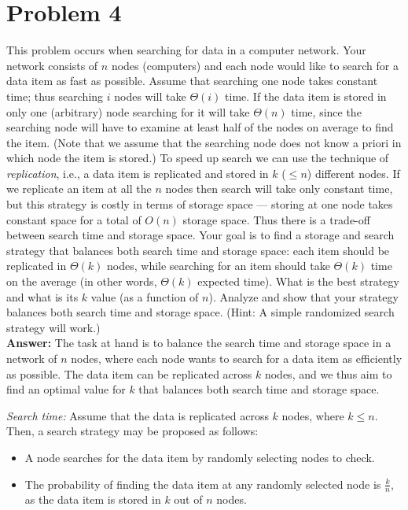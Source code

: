 \documentclass[11pt]{article}
\begin{document}
\section*{Problem 4}

This problem occurs  when searching
for data in a computer network. Your  network consists of $n$
nodes (computers) and each node would like to search for a data
item as fast as possible. Assume that searching one node takes
constant time; thus searching $i$ nodes will take $\Theta(i)$
time. If the data item is stored in only one (arbitrary) node
searching for it will take $\Theta(n)$
 time, since the searching node will have to examine at
least half of the nodes on average to find the item. (Note that we
assume that the searching node does not know a priori  in which
node the item is stored.) To speed up search we can use the
technique of {\em replication}, i.e., a data item is replicated
and stored in $k$ ($\leq n$) different nodes. If we replicate an
item at all the $n$ nodes then search will take only constant
time, but this strategy is costly in terms of storage space ---
storing at one node takes constant space for a total of  $O(n)$
storage space. Thus there is a trade-off between search time and
storage space. Your goal is to find a storage and search strategy
that balances both search time and storage space: each item should
be replicated in $\Theta(k)$ nodes, while searching for an item
should take $\Theta(k)$ time on the average (in other words,
$\Theta(k)$ expected time). What is the best strategy and what is
its   $k$ value (as a function of $n$). Analyze and show that your
strategy balances both search time and storage space.  (Hint: A
simple randomized search strategy will work.)\\

    \textbf{Answer:}
    The task at hand is to balance the search time and storage space in a network of \(n\) nodes, where each node wants to search for a data item as efficiently as possible. The data item can be replicated across \(k\) nodes, and we thus aim to find an optimal value for \(k\) that balances both search time and storage space.

    \emph{Search time:} Assume that the data is replicated across \(k\) nodes, where \(k \leq n\). Then, a search strategy may be proposed as follows:
    
    \begin{itemize}
        \item A node searches for the data item by randomly selecting nodes to check.

        \item The probability of finding the data item at any randomly selected node is $\frac{k}{n}$, as the data item is stored in \(k\) out of \(n\) nodes.
    \end{itemize}
\end{document}
